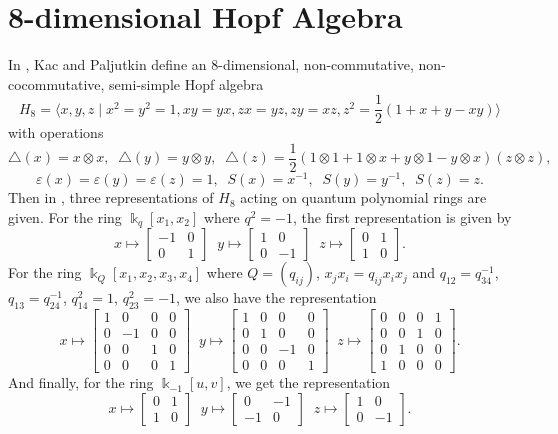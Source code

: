 \documentclass[12pt,a4paper]{article}
\newcommand{\kk}{\Bbbk}
\newcommand\1{_{(1)}}
\newcommand\2{_{(2)}}
\begin{document}
\section{8-dimensional Hopf Algebra}
In \cite{KP}, Kac and Paljutkin define an 8-dimensional, non-commutative, non-cocommutative, semi-simple Hopf algebra
\[
H_8=\langle x,y,z\;\vert\; x^2=y^2=1, xy=yx, zx=yz, zy=xz, z^2=\frac{1}{2}(1+x+y-xy)\rangle
\]
with operations
\[
\triangle(x)=x\otimes x,\;\; \triangle(y)=y\otimes y,\;\; \triangle(z)=\frac{1}{2}(1\otimes 1+1\otimes x+y\otimes 1-y\otimes x)(z\otimes z),
\]
\[
\varepsilon(x)=\varepsilon(y)=\varepsilon(z)=1,\;\; S(x)=x^{-1},\;\; S(y)=y^{-1},\;\; S(z)=z.
\]
Then in \cite{KKJ}, three representations of $H_8$ acting on quantum polynomial rings are given.
For the ring $\kk_q[x_1,x_2]$ where $q^2=-1$, the first representation is given by
\[
x\mapsto \begin{bmatrix}-1 & 0\\0 & 1\end{bmatrix} \;\; y\mapsto \begin{bmatrix} 1 & 0\\ 0 & -1\end{bmatrix} \;\; z\mapsto\begin{bmatrix} 0 & 1\\ 1 & 0\end{bmatrix}.
\]
For the ring $\kk_Q[x_1,x_2,x_3,x_4]$ where $Q=(q_{ij})$, $x_jx_i=q_{ij}x_ix_j$ and $q_{12}=q^{-1}_{34}$, $q_{13}=q^{-1}_{24}$, $q^2_{14}=1$, $q^2_{23}=-1$, we also have the representation 
\[
x\mapsto \begin{bmatrix} 1&0&0&0\\0&-1&0&0\\0&0&1&0\\0&0&0&1\end{bmatrix} \;\; y\mapsto \begin{bmatrix} 1&0&0&0\\0&1&0&0\\0&0&-1&0\\0&0&0&1\end{bmatrix}\;\; z\mapsto\begin{bmatrix}0&0&0&1\\0&0&1&0\\0&1&0&0\\1&0&0&0\end{bmatrix}.
\]
And finally, for the ring $\kk_{-1}[u,v]$, we get the representation
\[
x\mapsto \begin{bmatrix}0&1\\1&0\end{bmatrix}\;\; y\mapsto\begin{bmatrix}0&-1\\-1&0\end{bmatrix}\;\; z\mapsto\begin{bmatrix}1&0\\0&-1\end{bmatrix}.
\]
\end{document}
